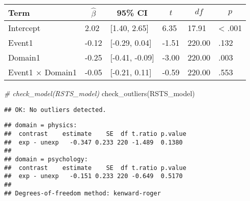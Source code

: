 \documentclass[
]{article}
\newenvironment{Shaded}{\begin{snugshade}}{\end{snugshade}}
\newcommand{\CommentTok}[1]{\textcolor[rgb]{0.56,0.35,0.01}{\textit{#1}}}
\newcommand{\FunctionTok}[1]{\textcolor[rgb]{0.00,0.00,0.00}{#1}}
\newcommand{\NormalTok}[1]{#1}
\newcommand{\SpecialCharTok}[1]{\textcolor[rgb]{0.00,0.00,0.00}{#1}}
\begin{document}
\begin{table}[tbp]

\begin{center}
\begin{threeparttable}

\caption{\label{tab:unnamed-chunk-13}}

\begin{tabular}{llllll}
\toprule
Term & \multicolumn{1}{c}{$\hat{\beta}$} & \multicolumn{1}{c}{95\% CI} & \multicolumn{1}{c}{$t$} & \multicolumn{1}{c}{$\mathit{df}$} & \multicolumn{1}{c}{$p$}\\
\midrule
Intercept & 2.02 & {}[1.40, 2.65] & 6.35 & 17.91 & < .001\\
Event1 & -0.12 & {}[-0.29, 0.04] & -1.51 & 220.00 & .132\\
Domain1 & -0.25 & {}[-0.41, -0.09] & -3.00 & 220.00 & .003\\
Event1 $\times$ Domain1 & -0.05 & {}[-0.21, 0.11] & -0.59 & 220.00 & .553\\
\bottomrule
\end{tabular}

\end{threeparttable}
\end{center}

\end{table}

\begin{Shaded}
\begin{Highlighting}[]
\CommentTok{\# check\_model(RSTS\_model)}
\FunctionTok{check\_outliers}\NormalTok{(RSTS\_model)}
\end{Highlighting}
\end{Shaded}

\begin{verbatim}
## OK: No outliers detected.
\end{verbatim}

\begin{Shaded}
\end{Shaded}

\begin{verbatim}
## domain = physics:
##  contrast    estimate    SE  df t.ratio p.value
##  exp - unexp   -0.347 0.233 220 -1.489  0.1380 
## 
## domain = psychology:
##  contrast    estimate    SE  df t.ratio p.value
##  exp - unexp   -0.151 0.233 220 -0.649  0.5170 
## 
## Degrees-of-freedom method: kenward-roger
\end{verbatim}
\end{document}
